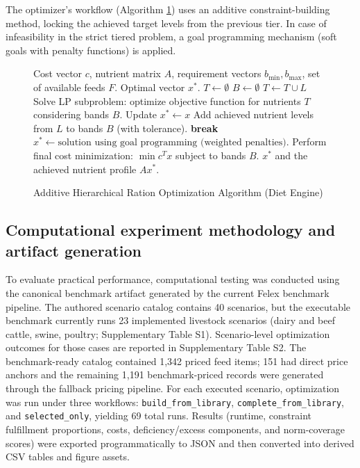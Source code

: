 \documentclass[a4paper,fleqn]{cas-dc}
\begin{document}
The optimizer's workflow (Algorithm \ref{alg:optimizer}) uses an additive constraint-building method, locking the achieved target levels from the previous tier. In case of infeasibility in the strict tiered problem, a goal programming mechanism (soft goals with penalty functions) is applied.

\begin{figure}[htbp]
\begin{algorithm}[H]
\caption{Additive Hierarchical Ration Optimization Algorithm (Diet Engine)}\label{alg:optimizer}
\begin{algorithmic}[1]
\Require Cost vector $c$, nutrient matrix $A$, requirement vectors $b_{\min}, b_{\max}$, set of available feeds $F$.
\Ensure Optimal vector $x^*$.
\State $T \gets \emptyset$ 
\State $B \gets \emptyset$ 
    \State $T \gets T \cup L$
    \State Solve LP subproblem: optimize objective function for nutrients $T$ considering bands $B$.
        \State Update $x^* \gets x$
        \State Add achieved nutrient levels from $L$ to bands $B$ (with tolerance).
    \Else
        \State \textbf{break}
    \EndIf
\EndFor
{}
    \State $x^* \gets \text{solution using goal programming (weighted penalties)}$.
\Else
    \State Perform final cost minimization: $\min c^T x$ subject to bands $B$.
\EndIf
\State \Return $x^*$ and the achieved nutrient profile $A x^*$.
\end{algorithmic}
\end{algorithm}
\end{figure}

\subsection{Computational experiment methodology and artifact generation}\label{subsec:experiment}

To evaluate practical performance, computational testing was conducted using the canonical benchmark artifact generated by the current Felex benchmark pipeline. The authored scenario catalog contains 40 scenarios, but the executable benchmark currently runs 23 implemented livestock scenarios (dairy and beef cattle, swine, poultry; Supplementary Table S1). Scenario-level optimization outcomes for those cases are reported in Supplementary Table S2. The benchmark-ready catalog contained 1,342 priced feed items; 151 had direct price anchors and the remaining 1,191 benchmark-priced records were generated through the fallback pricing pipeline. For each executed scenario, optimization was run under three workflows: \texttt{build\_from\_library}, \texttt{complete\_from\_library}, and \texttt{selected\_only}, yielding 69 total runs. Results (runtime, constraint fulfillment proportions, costs, deficiency/excess components, and norm-coverage scores) were exported programmatically to JSON and then converted into derived CSV tables and figure assets.
\end{document}
